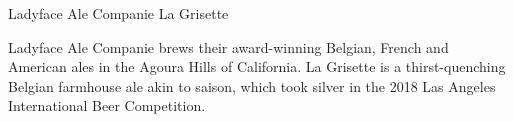\stylesection{\stylebelgianandfrenchale}

\begin{recipie}{Ladyface Ale Companie La Grisette}

\begin{aboutblock}
Ladyface Ale Companie brews their award-winning Belgian, French and American
ales in the Agoura Hills of California. La Grisette is a thirst-quenching
Belgian farmhouse ale akin to saison, which took silver in the 2018 Las Angeles
International Beer Competition.
\end{aboutblock}


\begin{methodandtiming}
 
\begin{mashsteps}
\end{mashsteps}

\end{methodandtiming}

\pagebreak

\begin{ingredientsblock}

\begin{malts}
\end{malts}

\begin{hops}
\end{hops}

\begin{yeasts}
\end{yeasts}

\end{ingredientsblock}

\end{recipie}

